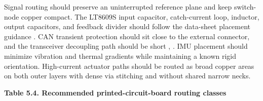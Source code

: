 Signal routing should preserve an uninterrupted reference plane and keep
switch-node copper compact. The LT8609S input capacitor, catch-current
loop, inductor, output capacitors, and feedback divider should follow
the data-sheet placement guidance \cite{analog2026lt8609s}. CAN transient protection
should sit close to the external connector, and the transceiver
decoupling path should be short \cite{nxp2026tja1051}, \cite{ti2026tida01238}. IMU placement should
minimize vibration and thermal gradients while maintaining a known rigid
orientation. High-current actuator paths should be routed as broad
copper areas on both outer layers with dense via stitching and without
shared narrow necks.

\clearpage
\begin{landscape}
\par\medskip\noindent\singlespacing
{}
\textbf{Table 5.4. Recommended printed-circuit-board routing classes}\par


\end{landscape}
